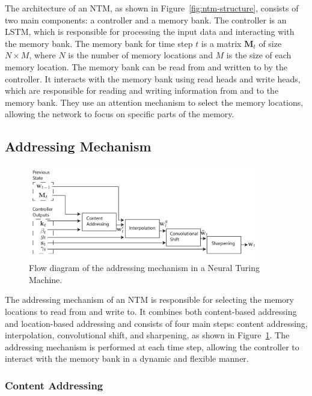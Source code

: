\documentclass{article}
\newcommand{\reffig}[1]{Figure~\ref{#1}}
\begin{document}
The architecture of an NTM, as shown in \reffig{fig:ntm-structure}, consists of two main
components: a controller and a memory bank. The controller is an LSTM, which is
responsible for processing the input data and interacting with the memory bank. The memory
bank for time step $t$ is a matrix $\textbf{M}_t$ of size $N \times M$, where $N$ is the
number of memory locations and $M$ is the size of each memory location. The memory bank
can be read from and written to by the controller. It interacts with the memory bank using
read heads and write heads, which are responsible for reading and writing information from
and to the memory bank. They use an attention mechanism to select the memory locations,
allowing the network to focus on specific parts of the memory.


\subsection{Addressing Mechanism}
\label{sec:4.1}

\begin{figure}[htbp]
  \centering
  \includegraphics[width=0.9\textwidth]{ntm_addr_4.png}
  \caption{Flow diagram of the addressing mechanism in a Neural Turing Machine.
    \cite{gravesNeuralTuringMachines2014}}
  \label{fig:ntm-addressing}
\end{figure}

The addressing mechanism of an NTM is responsible for selecting the memory locations to
read from and write to. It combines both content-based addressing and location-based
addressing and consists of four main steps: content addressing, interpolation,
convolutional shift, and sharpening, as shown in \reffig{fig:ntm-addressing}. The
addressing mechanism is performed at each time step, allowing the controller to interact
with the memory bank in a dynamic and flexible manner.


\subsubsection{Content Addressing}
\label{sec:4.1.0}
\end{document}
